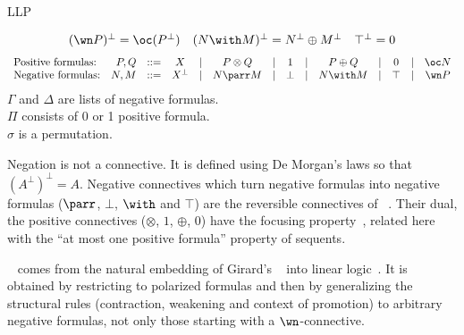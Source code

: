 \begin{entry}{LLP}
\begin{calculus}
\begin{center}
\[\begin{array}{c@{\quad}c@{\quad}c}
(\wn P)^\bot = \oc (P^\bot)
& (N\with M)^\bot = N^\bot\oplus M^\bot
& \top^\bot = 0
\end{array}
\]
\[
\begin{array}{lrlccccccccccc}
\textrm{Positive formulas:} & P,Q & ::= & X & \mid & P\otimes Q & \mid & 1 & \mid & P\oplus Q & \mid & 0 & \mid & \oc N \\
\textrm{Negative formulas:} & N,M & ::= & X^\bot & \mid & N\parr M & \mid & \bot & \mid & N\with M & \mid & \top & \mid & \wn P \\
\end{array}
\]
$\Gamma$ and $\Delta$ are lists of negative formulas.\\
$\Pi$ consists of 0 or 1 positive formula.\\
$\sigma$ is a permutation.
\end{center}
\end{calculus}


\begin{clarifications}
Negation is not a connective. It is defined using De Morgan's laws so that $(A^\bot)^\bot=A$.
Negative connectives which turn negative formulas into negative formulas ($\parr$, $\bot$, $\with$ and $\top$) are the reversible connectives of \LL~.
Their dual, the positive connectives ($\otimes$, $1$, $\oplus$, $0$) have the focusing property~\cite{focal}, related here with the ``at most one positive formula'' property of sequents.
\end{clarifications}

\begin{history}
\LLP~\cite{phdlaurent} comes from the natural embedding of Girard's \LC~ into linear logic~. It is obtained by restricting \LL{} to polarized formulas and then by generalizing the structural rules (contraction, weakening and context of promotion) to arbitrary negative formulas, not only those starting with a $\wn$-connective.
\end{history}


\end{entry}
